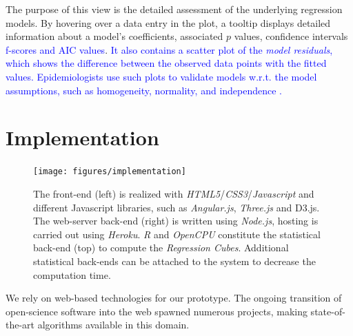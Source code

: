 \documentclass[journal]{style/vgtc} 			          %
\newcommand{\add}[1]{\textcolor{blue}{#1}}
\begin{document}
The purpose of this view is the detailed assessment of the underlying regression models.
By hovering over a data entry in the plot, a tooltip displays detailed information about a model's coefficients, associated $p$ values, confidence intervals \add{f-scores and AIC values}.
\add{
It also contains a scatter plot of the \emph{model residuals}, which shows the difference between the observed data points with the fitted values.
Epidemiologists use such plots to validate models w.r.t. the model assumptions, such as homogeneity, normality, and independence \cite{GraphicModelAssessment}.
}

\section{Implementation} \label{implementation}
\begin{figure}[htb]
 \centering
 \texttt{[image: figures/implementation]}
 \caption{
 The front-end (left) is realized with \emph{HTML5}/\emph{CSS3}/\emph{Javascript} and different Javascript libraries, such as \emph{Angular.js}, \emph{Three.js} and D3.js.
 The web-server back-end (right) is written using \emph{Node.js}, hosting is carried out using \emph{Heroku}.
 \emph{R} and \emph{OpenCPU} constitute the statistical back-end (top) to compute the \emph{Regression Cubes}.
 Additional statistical back-ends can be attached to the system to decrease the computation time.
 }
  \label{fig:Implementation}
\end{figure}
We rely on web-based technologies for our prototype.
The ongoing transition of open-science software into the web spawned numerous projects, making state-of-the-art algorithms available in this domain.
\end{document}
